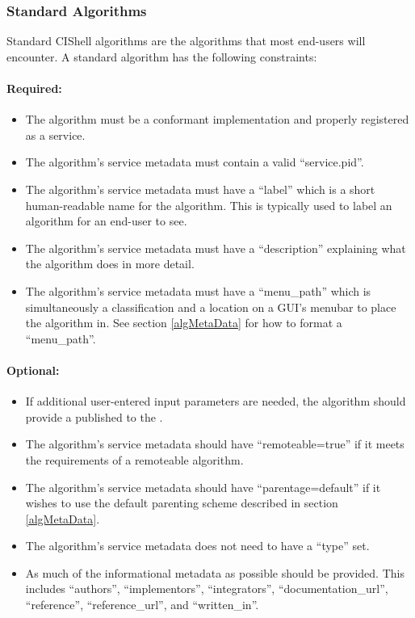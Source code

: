 \subsubsection{Standard Algorithms}

Standard CIShell algorithms are the algorithms that most end-users will
encounter. A standard algorithm has the following constraints:

\paragraph*{Required:}
\begin{itemize}
  \item The algorithm must be a conformant 
  implementation and properly registered as a service.
  \item The algorithm's service metadata must contain a valid ``service.pid''.
  \item The algorithm's service metadata must have a ``label'' which is a
  short human-readable name for the algorithm. This is typically used to label
  an algorithm for an end-user to see.
  \item The algorithm's service metadata must have a ``description''
  explaining what the algorithm does in more detail.
  \item The algorithm's service metadata must have a ``menu\_path'' which is
  simultaneously a classification and a location on a GUI's menubar to place
  the algorithm in. See section \ref{algMetaData} for how to format a
  ``menu\_path''.
\end{itemize}

\paragraph*{Optional:}
\begin{itemize}
  \item If additional user-entered input parameters are needed, the algorithm
  should provide a  published to the .
  \item The algorithm's service metadata should have ``remoteable=true'' if it
  meets the requirements of a remoteable algorithm.
  \item The algorithm's service metadata should have ``parentage=default'' if
  it wishes to use the default  parenting scheme described in
  section \ref{algMetaData}.
  \item The algorithm's service metadata does not need to have a ``type'' set.
  \item As much of the informational metadata as possible should be
  provided. This includes ``authors'', ``implementors'', ``integrators'',
  ``documentation\_url'', ``reference'', ``reference\_url'', and ``written\_in''.
\end{itemize}

